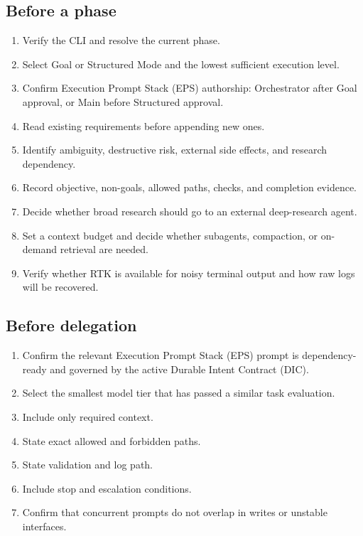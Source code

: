 \documentclass[11pt,a4paper]{article}
\begin{document}
\subsection{Before a phase}
\begin{enumerate}
  \item Verify the CLI and resolve the current phase.
  \item Select Goal or Structured Mode and the lowest sufficient execution level.
  \item Confirm Execution Prompt Stack (EPS) authorship: Orchestrator after Goal approval, or Main before Structured approval.
  \item Read existing requirements before appending new ones.
  \item Identify ambiguity, destructive risk, external side effects, and research dependency.
  \item Record objective, non-goals, allowed paths, checks, and completion evidence.
  \item Decide whether broad research should go to an external deep-research agent.
  \item Set a context budget and decide whether subagents, compaction, or on-demand retrieval are needed.
  \item Verify whether RTK is available for noisy terminal output and how raw logs will be recovered.
\end{enumerate}

\subsection{Before delegation}
\begin{enumerate}
  \item Confirm the relevant Execution Prompt Stack (EPS) prompt is dependency-ready and governed by the active Durable Intent Contract (DIC).
  \item Select the smallest model tier that has passed a similar task evaluation.
  \item Include only required context.
  \item State exact allowed and forbidden paths.
  \item State validation and log path.
  \item Include stop and escalation conditions.
  \item Confirm that concurrent prompts do not overlap in writes or unstable interfaces.
\end{enumerate}
\end{document}
